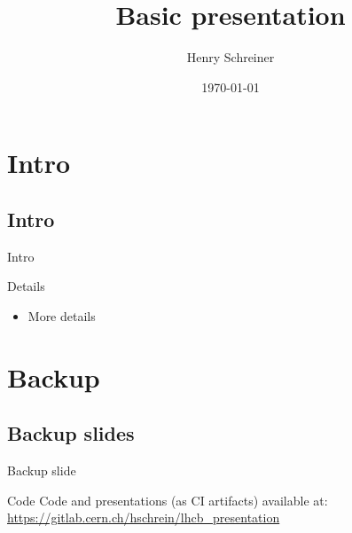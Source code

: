 \documentclass{beamer}
\title{Basic presentation}
\author[H. Schreiner]{Henry Schreiner}
\institute[LHCb]
{
	\begin{minipage}{3cm}
		\raggedleft
		LHCb \\
		University of Cincinnati 
	\end{minipage} \vspace{.25cm}
	\begin{minipage}{2cm}
		\texttt{[image: lhcb.jpg]}
	\end{minipage} \\
    \medskip
    \textit{henry.schreiner@cern.ch}
}
\date{\today}
\begin{document}
\begin{frame}
\titlepage
\end{frame}

\section{Intro}
\subsection{Intro}
\begin{frame}{Intro}

  \begin{block}{Details}
    \begin{itemize}
    	\item More details
   \end{itemize}
  \end{block}
  
\end{frame}


\backupbegin
\section{Backup}

\subsection{Backup slides}
\begin{frame}{Backup slide}
\end{frame}

\begin{frame}{Code}
	Code and presentations (as CI artifacts) available at: \url{https://gitlab.cern.ch/hschrein/lhcb_presentation}
\end{frame}

\backupend
\end{document}
